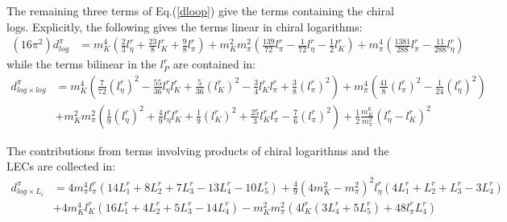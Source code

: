 \documentclass[12pt,a4paper]{article}
\begin{document}
The remaining three terms of Eq.(\ref{dloop}) give the terms containing the chiral logs. Explicitly, the following gives the terms linear in chiral logarithms:
\begin{align}
	(16 \pi^2) d^{\pi}_{log} &= m_{K}^4 \left(\frac{2}{3} l^r_{\eta} + \frac{23}{8} l^r_{K} + \frac{9}{8} l^r_{\pi} \right)+ m_{K}^2 m_{\pi}^2 \left(\frac{139}{72} l^r_{\pi} - \frac{1}{72} l^r_{\eta} - \frac{1}{2} l^r_{K} \right) + m_{\pi}^4 \left(\frac{1381}{288} l^r_{\pi} - \frac{11}{288} l^r_{\eta} \right) \label{dlogGMO}
\end{align}
while the terms bilinear in the $l_P^r$ are contained in:
\begin{align}
	d^{\pi}_{log \times log} &= m_{K}^4 \left(\frac{7}{72} (l^r_{\eta})^2 - \frac{55}{36} l^r_{\eta} l^r_{K} + \frac{5}{36} (l^r_{K})^2 - \frac{3}{4} l^r_{K} l^r_{\pi} + \frac{3}{8} (l^r_{\pi})^2 \right) + m_{\pi}^4 \left(  \frac{41}{8} (l^r_{\pi})^2 - \frac{1}{24}(l^r_{\eta})^2 \right) \nonumber \\
	& + m_{K}^2 m_{\pi}^2 \left(\frac{1}{9}(l^r_{\eta})^2 + \frac{4}{9} l^r_{\eta} l^r_{K} + \frac{1}{9} (l^r_{K})^2 +\frac{25}{3} l^r_{K} l^r_{\pi} - \frac{7}{6} (l^r_{\pi})^2 \right)  + \frac{1}{2} \frac{m_{K}^6}{m_{\pi}^2} \left( l^r_{\eta} - l^r_{K} \right)^2 \label{dloglogGMO}
\end{align}

The contributions from terms involving products of chiral logarithms and the LECs are collected in:
\begin{align}
	d^{\pi}_{log \times L_i} & = 4 m_{\pi}^4 l^r_{\pi} (14 L^r_{1}+8 L^r_{2}+7 L^r_{3}-13 L^r_{4}-10 L^r_{5}) + \frac{4}{9} \left(4 m_{K}^2-m_{\pi}^2\right)^2 l^r_{\eta}  (4 L^r_{1}+L^r_{2}+L^r_{3}-3 L^r_{4}) \nonumber \\
	& + 4 m_{K}^4 l^r_{K} (16 L^r_{1}+4 L^r_{2}+5 L^r_{3}-14 L^r_{4}) - m_{K}^2 m_{\pi}^2 (4 l^r_{K} (3 L^r_{4} + 5 L^r_{5}) + 48 l^r_{\pi} L^r_{4})
\end{align}
\end{document}
